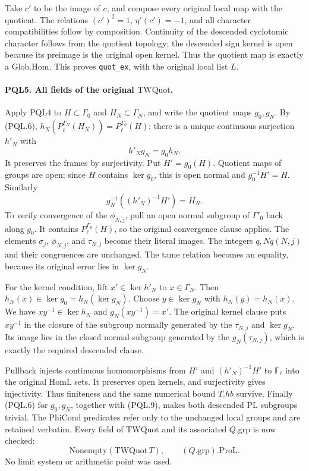 Take \(c'\) to be the image of \(c\), and compose every
original local map with the quotient. The relations
\((c')^2=1\), \(\eta'(c')=-1\), and all character compatibilities
follow by composition. Continuity of the descended
cyclotomic character follows from the quotient topology;
the descended sign kernel is open because its preimage is
the original open kernel. Thus the quotient map is exactly
a \(\mathrm{Glob.Hom}\). This proves \texttt{quot\_ex},
with the original local list \(L\).

\paragraph{PQL5. All fields of the original \(\mathrm{TWQuot}\).}
\label{claim:PQL5}
Apply PQL4 to \(H\subset\Gamma_0\) and \(H_N\subset\Gamma_N\),
and write the quotient maps \(g_0,g_N\). By (PQL.6),
\(h_N(P_\ell^{\Gamma_N}(H_N))=P_\ell^{\Gamma_0}(H)\);
there is a unique continuous surjection \(h'_N\) with
\[
 h'_Ng_N=g_0h_N.                                    \tag{PQL.8}
\]
It preserves the frames by surjectivity. Put \(H'=g_0(H)\).
Quotient maps of groups are open; since \(H\) contains
\(\ker g_0\), this is open normal and \(g_0^{-1}H'=H\).
Similarly
\[
 g_N^{-1}((h'_N)^{-1}H')=H_N.                        \tag{PQL.9}
\]
To verify convergence of the \(\phi_{N,j}\), pull an open
normal subgroup of \(\Gamma'_0\) back along \(g_0\).
It contains \(P_\ell^{\Gamma_0}(H)\), so the original
convergence clause applies. The elements \(\sigma_j\),
\(\phi_{N,j}\), and \(\tau_{N,j}\) become their literal
images. The integers \(q,Nq(N,j)\) and their congruences
are unchanged. The tame relation becomes an equality,
because its original error lies in \(\ker g_N\).

For the kernel condition, lift \(x'\in\ker h'_N\) to
\(x\in\Gamma_N\). Then \(h_N(x)\in\ker g_0=h_N(\ker g_N)\).
Choose \(y\in\ker g_N\) with \(h_N(y)=h_N(x)\). We have
\(xy^{-1}\in\ker h_N\) and \(g_N(xy^{-1})=x'\).
The original kernel clause puts \(xy^{-1}\) in the closure
of the subgroup normally generated by the \(\tau_{N,j}\)
and \(\ker g_N\). Its image lies in the closed normal
subgroup generated by the \(g_N(\tau_{N,j})\), which is
exactly the required descended clause.

Pullback injects continuous homomorphisms from \(H'\) and
\((h'_N)^{-1}H'\) to \(\mathbb F_\ell\) into the original
\(\mathrm{HomL}\) sets. It preserves open kernels, and
surjectivity gives injectivity. Thus finiteness and the
same numerical bound \(T.hb\) survive. Finally (PQL.6)
for \(g_0,g_N\), together with (PQL.9), makes both
descended \(\mathrm{PL}\) subgroups trivial.
The \(\mathrm{PhiCond}\) predicates refer only to the
unchanged local groups and are retained verbatim.
Every field of \(\mathrm{TWQuot}\) and its associated
\(Q.\mathrm{grp}\) is now checked:
\[
 \mathrm{Nonempty}(\mathrm{TWQuot}\,T),
 \qquad (Q.\mathrm{grp}).\mathrm{ProL}.              \tag{PQL.10}
\]
No limit system or arithmetic point was used.

